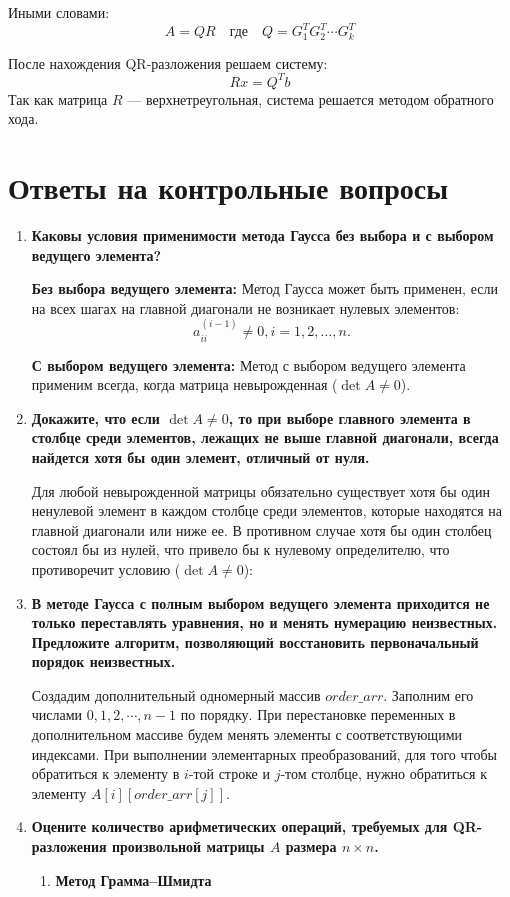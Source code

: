 \documentclass[12pt, a4paper]{article}
\begin{document}
	Иными словами:
	$$A=QR \quad \text{где} \quad Q=G_1^{T}G_2^{T} \cdots G_{k}^{T}$$
	
	После нахождения QR-разложения решаем систему:
	$$Rx=Q^{T}b$$
	Так как матрица $R$ — верхнетреугольная, система решается методом обратного хода.
	\section{Ответы на контрольные вопросы}
	\begin{enumerate}
	\item \textbf{Каковы условия применимости метода Гаусса без выбора
	и с выбором ведущего элемента?}
	
		\textbf{Без выбора ведущего элемента:} Метод Гаусса может быть применен, если на всех шагах на главной диагонали не возникает нулевых элементов: $$a^{(i-1)}_{ii}\ne 0, i = 1,2,\ldots,n.$$

		 \textbf {С выбором ведущего элемента:} Метод с выбором ведущего элемента  применим всегда, когда матрица невырожденная ($\det A \ne 0$).
		 
	\item \textbf{Докажите, что если $\det A \ne 0$, то при выборе главного
	элемента в столбце среди элементов, лежащих не выше главной диагонали, всегда найдется хотя бы один элемент, отличный от нуля.}
	
		 Для любой невырожденной матрицы обязательно существует хотя бы один ненулевой элемент в каждом столбце среди элементов, которые находятся на главной диагонали или ниже ее. В противном случае хотя бы один столбец состоял бы из нулей, что привело бы к нулевому определителю, что противоречит условию ($\det A \ne 0$):
	

	\item \textbf{В методе Гаусса с полным выбором ведущего элемента приходится не только переставлять уравнения, но и менять нумерацию неизвестных. Предложите алгоритм, позволяющий восстановить первоначальный порядок неизвестных.}
	
	Создадим дополнительный одномерный массив $order\_arr$. Заполним его числами $0,1,2,\cdots, n-1$ по порядку. При перестановке переменных в дополнительном массиве будем менять элементы с соответствующими индексами. При выполнении элементарных преобразований, для того чтобы обратиться  к элементу в $i$-той строке и $j$-том столбце, нужно обратиться к элементу $A[i][order\_arr[j]]$.
	
	
	
	\item \textbf{Оцените количество арифметических операций, требуемых
	для QR-разложения произвольной матрицы $A$ размера $n \times n$.}
	\begin{enumerate}
		\item \textbf{ Метод Грамма--Шмидта}
		

\end{enumerate}
\end{enumerate}
\end{document}
